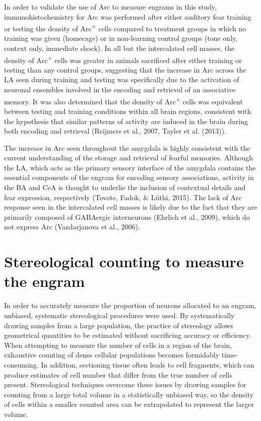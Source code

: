 \documentclass[12pt,a4paperpaper,]{report}
\begin{document}
In order to validate the use of Arc to measure engrams in this study,
immunohistochemistry for Arc was performed after either auditory fear
training or testing the density of Arc\textsuperscript{+} cells compared
to treatment groups in which no training was given (homecage) or in
non-learning control groups (tone only, context only, immediate shock).
In all but the intercalated cell masses, the density of
Arc\textsuperscript{+} cells was greater in animals sacrificed after
either training or testing than any control groups, suggesting that the
increase in Arc across the LA seen during training and testing was
specifically due to the activation of neuronal ensembles involved in the
encoding and retrieval of an associative memory. It was also determined
that the density of Arc\textsuperscript{+} cells was equivalent between
testing and training conditions within all brain regions, consistent
with the hypothesis that similar patterns of activity are induced in the
brain during both encoding and retrieval (Reijmers et al., 2007, Tayler
et al. (2013)).

The increase in Arc seen throughout the amygdala is highly consistent
with the current understanding of the storage and retrieval of fearful
memories. Although the LA, which acts as the primary sensory interface
of the amygdala contains the essential components of the engram for
encoding sensory associations, activity in the BA and CeA is thought to
underlie the inclusion of contextual details and fear expression,
respectively (Tovote, Fadok, \& Lüthi, 2015). The lack of Arc response
seen in the intercalated cell masses is likely due to the fact that they
are primarily composed of GABAergic interneurons (Ehrlich et al., 2009),
which do not express Arc (Vazdarjanova et al., 2006).

\section{Stereological counting to measure the
engram}\label{stereological-counting-to-measure-the-engram}

In order to accurately measure the proportion of neurons allocated to an
engram, unbiased, systematic stereological procedures were used. By
systematically drawing samples from a large population, the practice of
stereology allows geometrical quantities to be estimated without
sacrificing accuracy or efficiency. When attempting to measure the
number of cells in a region of the brain, exhaustive counting of dense
cellular populations becomes formidably time-consuming. In addition,
sectioning tissue often leads to cell fragments, which can produce
estimates of cell number that differ from the true number of cells
present. Stereological techniques overcome these issues by drawing
samples for counting from a large total volume in a statistically
unbiased way, so the density of cells within a smaller counted area can
be extrapolated to represent the larger volume.
\end{document}
